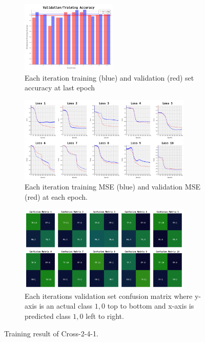 \documentclass{article}
\begin{document}
\begin{figure}[ht]
	\begin{subfigure}{\textwidth}
		\centering
		\includegraphics[width=0.5\textwidth]{cross-2-4-1/acc}
		\caption{Each iteration training (blue) and validation (red) set accuracy at last epoch}
	\end{subfigure}
	\begin{subfigure}{\textwidth}
		\centering
		\includegraphics[width=0.9\textwidth]{cross-2-4-1/loss}
		\caption{Each iteration training MSE (blue) and validation MSE (red) at each epoch.}
	\end{subfigure}
	\begin{subfigure}{\textwidth}
		\centering
		\includegraphics[width=0.9\textwidth]{cross-2-4-1/confusion_matrix}
		\caption{Each iterations validation set confusion matrix where y-axis is an actual class $1, 0$ top to bottom and x-axis is predicted class $1, 0$ left to right.}
	\end{subfigure}
	\caption{Training result of Cross-2-4-1.}
	\label{fig:7}
\end{figure}
\FloatBarrier
\end{document}
